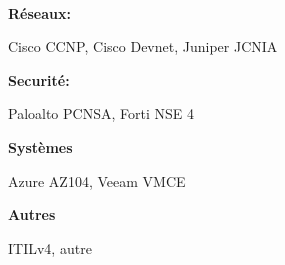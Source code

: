 \documentclass[9pt]{developercv} %
\begin{document}
\begin{minipage}[t]{0.46\textwidth}
	\vspace{-6pt}
 
	\lipsum[1][1-4] \\
\end{minipage}
\hfill %
\begin{minipage}[t]{0.465\textwidth}
    \vspace{-6pt}
    
    \begin{minipage}[t]{0.2\textwidth}
        \textbf{Réseaux:}
    \end{minipage}
    \hfill
    \begin{minipage}[t]{1.5\textwidth}
      Cisco CCNP, Cisco Devnet, Juniper JCNIA
    \end{minipage}

    \begin{minipage}[t]{0.2\textwidth}
        \textbf{Securité:}
    \end{minipage}
    \hfill
    \begin{minipage}[t]{1.5\textwidth}
      Paloalto PCNSA, Forti NSE 4
    \end{minipage}

    \begin{minipage}[t]{0.2\textwidth}
        \textbf{Systèmes}
    \end{minipage}
    \hfill
    \begin{minipage}[t]{1.5\textwidth}
      Azure AZ104, Veeam VMCE
    \end{minipage}

    \begin{minipage}[t]{0.2\textwidth}
        \textbf{Autres}
    \end{minipage}
    \hfill
    \begin{minipage}[t]{1.5\textwidth}
      ITILv4, autre
    \end{minipage}

\end{minipage}
\end{document}
